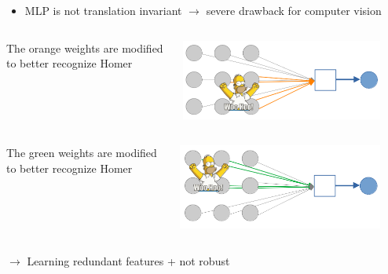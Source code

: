 \documentclass[usenames,dvipsnames]{beamer}
\begin{document}
    \begin{frame}{\secname}{\subsecname}
        \begin{itemize}
            \item MLP is not translation invariant $\rightarrow$ severe drawback for computer vision
        \end{itemize}
        \begin{columns}
            \begin{column}{0.5\textwidth}
               The {\color{orange} orange weights} are modified to better recognize Homer
            \end{column}
            \begin{column}{0.5\textwidth}
                \begin{center}
                 \includegraphics[width=0.9\textwidth]{figures/DL_fundamentals/MLP_invariance_issue_homer_down.png}
                 \end{center}
            \end{column}
        \end{columns}
        \begin{columns}
            \begin{column}{0.5\textwidth}
               The {\color{ForestGreen}green weights} are modified to better recognize Homer
            \end{column}
            \begin{column}{0.5\textwidth}
                \begin{center}
                 \includegraphics[width=0.9\textwidth]{figures/DL_fundamentals/MLP_invariance_issue_homer_up.png}
                 \end{center}
            \end{column}
        \end{columns}
        \vspace{0.8em}
        $\rightarrow$ Learning redundant features + not robust
    \end{frame}
\end{document}
